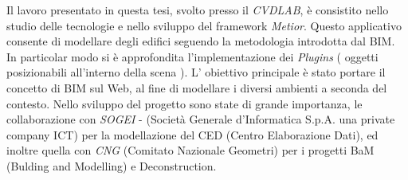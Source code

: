Il lavoro presentato in questa tesi, svolto presso il \emph{CVDLAB}, è consistito nello studio delle tecnologie
e nello sviluppo del framework \emph{Metior}. Questo applicativo consente di modellare degli edifici seguendo la
metodologia introdotta dal BIM.
In particolar modo si è approfondita l'implementazione dei \emph{Plugins} ( oggetti posizionabili all'interno della scena ).
L' obiettivo principale è stato portare il concetto di BIM sul Web, al fine di modellare
i diversi ambienti a seconda del contesto.
Nello sviluppo del progetto sono state di grande importanza, le collaborazione con \emph{SOGEI} -
(Società Generale d'Informatica S.p.A. una private company ICT) per la modellazione del CED (Centro Elaborazione Dati),
ed inoltre quella con \emph{CNG} (Comitato Nazionale Geometri) per i progetti BaM (Bulding and Modelling) e Deconstruction.\\
